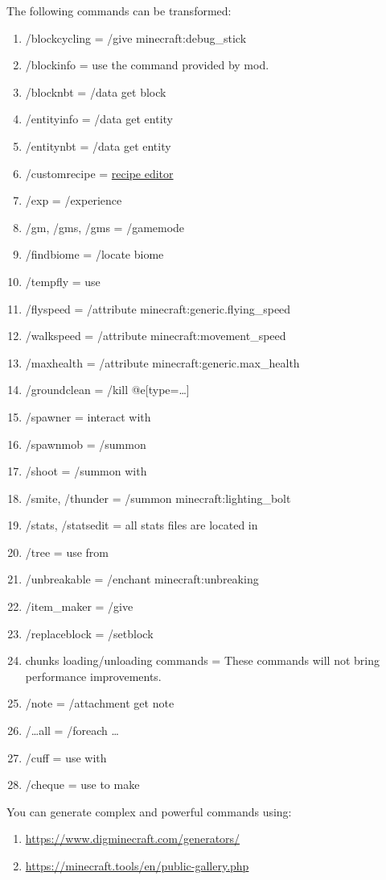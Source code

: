 \label{ch:transformer}
The following commands can be transformed:
\begin{enumerate}
    \item /blockcycling = /give \player minecraft:debug\_stick
    \item /blockinfo = use the command  provided by  mod.
    \item /blocknbt = /data get block
    \item /entityinfo = /data get entity
    \item /entitynbt = /data get entity
    \item /customrecipe = \href{https://crafting.thedestruc7i0n.ca/}{recipe editor}
    \item /exp = /experience
    \item /gm, /gms, /gms = /gamemode
    \item /findbiome = /locate biome
    \item /tempfly = use 
    \item /flyspeed = /attribute \player minecraft:generic.flying\_speed
    \item /walkspeed = /attribute \player minecraft:movement\_speed
    \item /maxhealth = /attribute \player minecraft:generic.max\_health
    \item /groundclean = /kill @e[type=\ldots]
    \item /spawner = interact  with 
    \item /spawnmob = /summon
    \item /shoot = /summon with 
    \item /smite, /thunder = /summon minecraft:lighting\_bolt
    \item /stats, /statsedit = all stats files are located in 
    \item /tree = use  from 
    \item /unbreakable = /enchant \player minecraft:unbreaking
    \item /item\_maker = /give
    \item /replaceblock = /setblock
    \item chunks loading/unloading commands = These commands will not bring performance improvements.
    \item /note = /attachment get note
    \item /\ldots all = /foreach \ldots
    \item /cuff = use  with 
    \item /cheque = use  to make 
\end{enumerate}

\clearpage
{}
You can generate complex and powerful commands using:
\begin{enumerate}
    \item \url{https://www.digminecraft.com/generators/}
    \item \url{https://minecraft.tools/en/public-gallery.php}
\end{enumerate}


